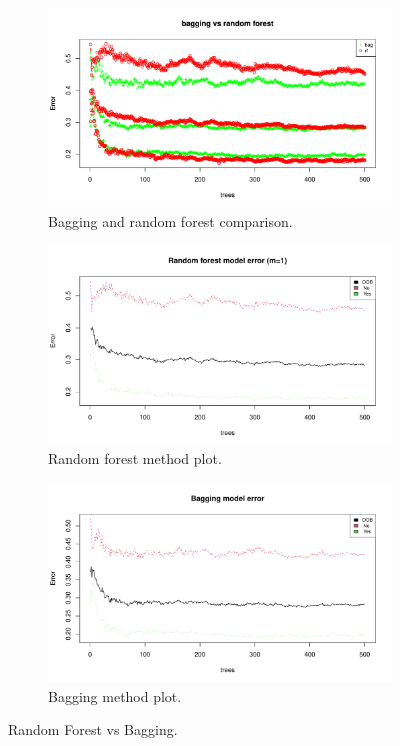 \begin{figure}[H]
	\centering
	\begin{subfigure}{.3\textwidth}
		\centering
		\includegraphics[width=\linewidth]{ImageFiles/Classification/Trees/vs_bagg_for_500_plot}
		\caption{Bagging and random forest comparison.}
		\label{fig:vs_bagg_for_500_plot}
	\end{subfigure}%
	\hfill
	\begin{subfigure}{.3\textwidth}
		\centering
		\includegraphics[width=\linewidth]{ImageFiles/Classification/Trees/best_for_500_plot}
		\caption{Random forest method plot.}
		\label{fig:best_for_500_plot}
	\end{subfigure}%
	\hfill
	\begin{subfigure}{.3\textwidth}
		\centering
		\includegraphics[width=\linewidth]{ImageFiles/Classification/Trees/bagg_500_plot}
		\caption{Bagging method plot.}
		\label{fig:bagg_500_plot}
	\end{subfigure}
	\caption{Random Forest vs Bagging.}
	\label{fig:RFvsB}
\end{figure}

